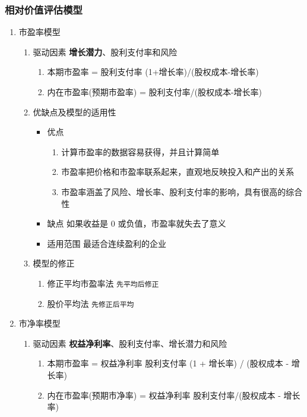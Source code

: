 \documentclass[11pt]{article}
\begin{document}
\subsubsection{相对价值评估模型}
\label{sec:org8d29b69}
\begin{enumerate}
\item 市盈率模型
\label{sec:org58e5d56}
\begin{enumerate}
\item 驱动因素
\label{sec:orgdc93bd8}
\textbf{增长潜力}、股利支付率和风险
\begin{enumerate}
\item 本期市盈率 = 股利支付率 \texttimes{} (1+增长率)/(股权成本-增长率)
\item 内在市盈率(预期市盈率) = 股利支付率/(股权成本-增长率)
\end{enumerate}
\item 优缺点及模型的适用性
\label{sec:orgd83bb67}
\begin{itemize}
\item 优点
\begin{enumerate}
\item 计算市盈率的数据容易获得，并且计算简单
\item 市盈率把价格和市盈率联系起来，直观地反映投入和产出的关系
\item 市盈率涵盖了风险、增长率、股利支付率的影响，具有很高的综合性
\end{enumerate}
\item 缺点
如果收益是 0 或负值，市盈率就失去了意义
\item 适用范围
最适合连续盈利的企业
\end{itemize}
\item 模型的修正
\label{sec:orgd504fd9}
\begin{enumerate}
\item 修正平均市盈率法
\texttt{先平均后修正}
\item 股价平均法
\texttt{先修正后平均}
\end{enumerate}
\end{enumerate}
\item 市净率模型
\label{sec:org087850c}
\begin{enumerate}
\item 驱动因素
\label{sec:orgce02557}
\textbf{权益净利率}、股利支付率、增长潜力和风险
\begin{enumerate}
\item 本期市盈率 = 权益净利率 \texttimes{} 股利支付率 \texttimes{} (1 + 增长率) / (股权成本 - 增长率)
\item 内在市盈率(预期市净率) = 权益净利率 \texttimes{} 股利支付率/(股权成本 - 增长率)

\end{enumerate}
\end{enumerate}
\end{enumerate}
\end{document}
